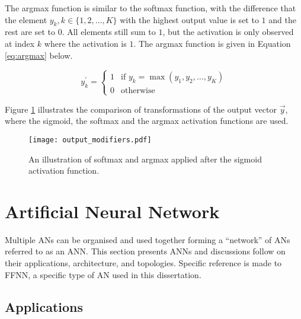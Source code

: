 The argmax function is similar to the softmax function, with the difference that the element $y_k, k \in \{1,2, \dots, K\}$ with the highest output value is set to $1$ and the rest are set to $0$. All elements still sum to $1$, but the activation is only observed at index $k$ where the activation is $1$. The argmax function is given in Equation \eqref{eq:argmax} below.

\begin{equation}
    y^{'}_k =
    \begin{cases}
        1 & \text{if $y_k = \max(y_1, y_2, \dots, y_K)$} \\
        0 & \text{otherwise}
        \label{eq:argmax}
    \end{cases}
\end{equation}

\noindent
Figure \ref{fig:anns:activation_functions:softmax_argmax} illustrates the comparison of transformations of the output vector $\vec{y}$, where the sigmoid, the softmax and the argmax activation functions are used.


\begin{figure}[htpb]
    \centering
    \texttt{[image: output\_modifiers.pdf]}
    \caption[The results of softmax and argmax]{An illustration of softmax and argmax applied after the sigmoid activation function.}
    \label{fig:anns:activation_functions:softmax_argmax}
\end{figure}


\section{Artificial Neural Network} \label{sec:anns:ann}

Multiple \acp{AN} can be organised and used together forming a ``network'' of \acp{AN} referred to as an \acf{ANN}. This section presents \acp{ANN} and discussions follow on their applications, architecture, and topologies. Specific reference is made to \acf{FFNN}, a specific type of \acs{AN} used in this dissertation.

\subsection{Applications} \label{sec:anns:anns:applications}

